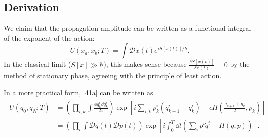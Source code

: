 \documentclass{article}
\begin{document}
\subsection{Derivation}

We claim that the propagation amplitude can be written as a functional integral of the exponent of the action:
\begin{equation}
    U(x_a,x_b;T)=\int\mathcal Dx(t)e^{iS[x(t)]/\hbar}.
    \label{41a}
\end{equation}
In the classical limit ($S[x]\gg\hbar$), this makes sense because $\frac{\delta S[x(t)]}{\delta x(t)}=0$ by the method of stationary phase, agreeing with the principle of least action. 

In a more practical form, \eqref{41a} can be written as 
\begin{align}
    \begin{split}
        U(q_0,q_N;T)&=\left(\prod_{i,k}\int\frac{\dd q^i_k\dd q^i_k}{2\pi}\right)\exp\left[i\sum_{i,k}p^i_k(q^i_{k+1}-q^i_k)-\epsilon H\left(\frac{q_{k+1}+q_k}{2},p_k\right)\right]\\
        &=\left(\prod_i\int\mathcal Dq(t)\mathcal Dp(t)\right)\exp\left[i\int^T_0\dd t\left(\sum_ip^i\dot q^i-H(q,p)\right)\right].
    \end{split}
\end{align}
\end{document}
